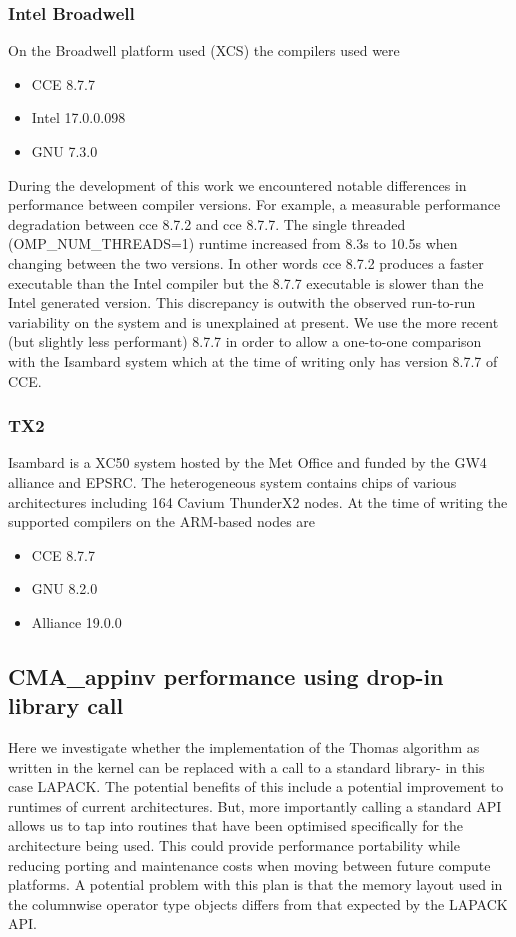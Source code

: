 \subsubsection{Intel Broadwell}
On the Broadwell platform used (XCS) the compilers used were
\begin{itemize}
\item CCE 8.7.7
\item Intel 17.0.0.098
\item GNU 7.3.0
\end{itemize}



During the development of this work we encountered notable differences in performance between compiler versions.
For example, a measurable performance degradation between cce 8.7.2 and cce 8.7.7.
The single threaded (OMP\_NUM\_THREADS=1) runtime increased from 8.3s to 10.5s when changing between the two versions.
In other words cce 8.7.2 produces a faster executable than the Intel compiler but the 8.7.7 executable is slower than the Intel generated version.
This discrepancy is outwith the observed run-to-run variability on the system and is unexplained at present.
We use the more recent (but slightly less performant) 8.7.7 in order to allow a one-to-one comparison with the Isambard system which at the time of writing only has version 8.7.7 of CCE.

\subsubsection{TX2}
Isambard is a XC50 system hosted by the Met Office and funded by the GW4 alliance and EPSRC.
The heterogeneous system contains chips of various architectures including 164 Cavium ThunderX2 nodes.
At the time of writing the supported compilers on the ARM-based nodes are
\begin{itemize}
\item CCE 8.7.7
\item GNU 8.2.0
\item Alliance 19.0.0
\end{itemize}




\subsection{CMA\_appinv performance using drop-in library call}
Here we investigate whether the implementation of the Thomas algorithm as written in the kernel can be replaced with a call to a standard library- in this case LAPACK.
The potential benefits of this include a potential improvement to runtimes of current architectures.
But, more importantly calling a standard API allows us to tap into routines that have been optimised specifically for the architecture being used.
This could provide performance portability while reducing porting and maintenance costs when moving between future compute platforms.
A potential problem with this plan is that the memory layout used in the columnwise operator type objects differs from that expected by the LAPACK API.

